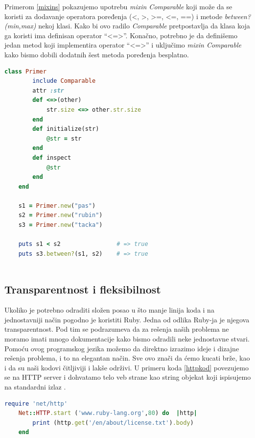 \documentclass[a4paper]{article}
\begin{document}
Primerom \ref{mixins} pokazujemo upotrebu \emph{mixin Comparable} koji može da se koristi za dodavanje operatora poređenja (\textless , \textgreater , \textgreater =, \textless =, ==) i metode \emph{between?(min,max)} nekoj klasi. Kako bi ovo radilo \emph{Comparable} pretpostavlja da klasa koja ga koristi ima definisan operator  “\textless =\textgreater”. Konačno, potrebno je da definišemo jedan metod koji implementira operator “\textless =\textgreater” i uključimo \emph{mixin Comparable} kako bismo dobili dodatnih šest metoda poređenja besplatno.
\begin{lstlisting}[language=Ruby, caption={Primer koda}, frame=single, label=mixins]
	class Primer
		include Comparable
		attr :str
		def <=>(other)
			str.size <=> other.str.size
		end
		def initialize(str)
			@str = str
		end
		def inspect
			@str
		end
	end
	
	s1 = Primer.new("pas")
	s2 = Primer.new("rubin")
	s3 = Primer.new("tacka")
	
	puts s1 < s2 				# => true
	puts s3.between?(s1, s2)	# => true
	
\end{lstlisting}\vspace*{-15pt}

\subsection{Transparentnost i fleksibilnost}
Ukoliko je potrebno odraditi složen posao u što manje linija koda i na jednostavniji način pogodno je koristiti Ruby. %
Jedna od odlika Ruby-ja je njegova transparentnost. Pod tim se podrazumeva da za rešenja naših problema ne moramo imati mnogo dokumentacije kako bismo odradili neke jednostavne stvari. Pomoću ovog programskog jezika možemo da direktno izrazimo ideje i dizajne rešenja problema, i to na elegantan način. Sve ovo znači da ćemo kucati brže, kao i da su naši kodovi čitljiviji i lakše održivi. U primeru koda \ref{httpkod} povezujemo se na HTTP server i dohvatamo telo veb strane kao string objekat koji ispisujemo na standardni izlaz \cite{poignant}.
\begin{lstlisting}[language=Ruby, caption = "Primer koda", label=httpkod]
	require 'net/http'
	Net::HTTP.start ('www.ruby-lang.org',80) do  |http|
		print (http.get('/en/about/license.txt').body)
	end
\end{lstlisting}\vspace*{-15pt}
\end{document}
